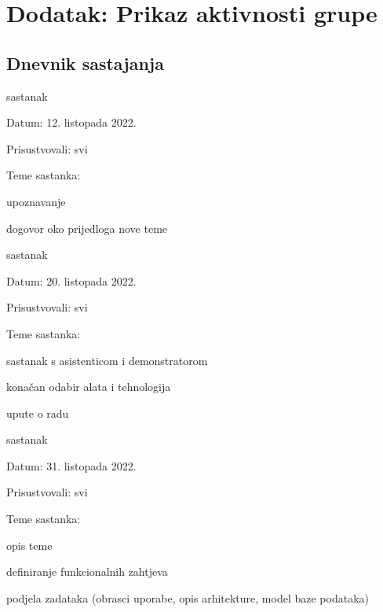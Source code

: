 \chapter*{Dodatak: Prikaz aktivnosti grupe}
		
		\section*{Dnevnik sastajanja}

		
		\begin{packed_enum}
			\item  sastanak
			\item[] \begin{packed_item}
				\item Datum: 12. listopada 2022.
				\item Prisustvovali: svi
				\item Teme sastanka:
				\begin{packed_item}
					\item  upoznavanje
					\item  dogovor oko prijedloga nove teme
				\end{packed_item}
			\end{packed_item}
			
			\item  sastanak
			\item[] \begin{packed_item}
				\item Datum: 20. listopada 2022.
				\item Prisustvovali: svi
				\item Teme sastanka:
				\begin{packed_item}
					\item  sastanak s asistenticom i demonstratorom
					\item  konačan odabir alata i tehnologija
					\item upute o radu
				\end{packed_item}
			\end{packed_item}
		
			\item  sastanak
			\item[] \begin{packed_item}
				\item Datum: 31. listopada 2022.
				\item Prisustvovali: svi
				\item Teme sastanka:
				\begin{packed_item}
					\item  opis teme
					\item  definiranje funkcionalnih zahtjeva
					\item podjela zadataka (obrasci uporabe, opis arhitekture, model baze podataka) 
				\end{packed_item}
			\end{packed_item}
		

\end{packed_enum}
